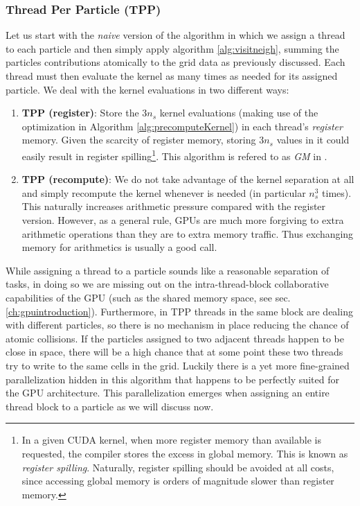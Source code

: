 \documentclass[ twoside,openright,titlepage,numbers=noenddot,%
headinclude,footinclude,cleardoublepage=empty,abstract=on,
BCOR=5mm,paper=a4,fontsize=11pt, dvipsnames
]{scrreprt}
\begin{document}
\subsubsection*{Thread Per Particle (TPP)}
Let us start with the \emph{naive} version of the algorithm in which we assign a thread to each particle and then simply apply algorithm \ref{alg:visitneigh}, summing the particles contributions atomically to the grid data as previously discussed. Each thread must then evaluate the kernel as many times as needed for its assigned particle. We deal with the kernel evaluations in two different ways:
\begin{enumerate}
\item \textbf{TPP (register)}: Store the $3n_s$ kernel evaluations (making use of the optimization in Algorithm \ref{alg:precomputeKernel}) in each thread's \emph{register} memory. Given the scarcity of register memory, storing $3n_s$ values in it could easily result in register spilling\footnote{In a given CUDA kernel, when more register memory than available is requested, the compiler stores the excess in global memory. This is known as \emph{register spilling}. Naturally, register spilling should be avoided at all costs, since accessing global memory is orders of magnitude slower than register memory.}. This algorithm is refered to as \emph{GM} in \cite{Shih2021}.
\item \textbf{TPP (recompute)}: We do not take advantage of the kernel separation at all and simply recompute the kernel whenever is needed (in particular $n_s^3$ times). This naturally increases arithmetic pressure compared with the register version. However, as a general rule, GPUs are much more forgiving to extra arithmetic operations than they are to extra memory traffic. Thus exchanging memory for arithmetics is usually a good call.
\end{enumerate}
While assigning a thread to a particle sounds like a reasonable separation of tasks, in doing so we are missing out on the intra-thread-block collaborative capabilities of the GPU (such as the shared memory space, see sec. \ref{ch:gpuintroduction}). Furthermore, in TPP threads in the same block are dealing with different particles, so there is no mechanism in place reducing the chance of atomic collisions. If the particles assigned to two adjacent threads happen to be close in space, there will be a high chance that at some point these two threads try to write to the same cells in the grid. Luckily there is a yet more fine-grained parallelization hidden in this algorithm that happens to be perfectly suited for the GPU architecture. This parallelization emerges when assigning an entire thread block to a particle as we will discuss now.
\end{document}
